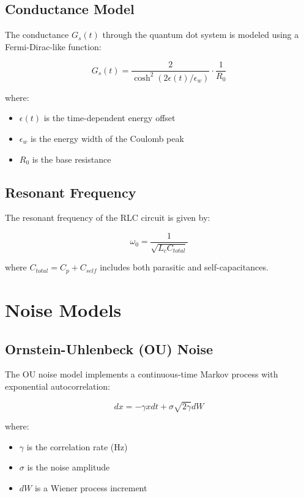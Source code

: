 \documentclass[11pt,a4paper]{article}
\begin{document}
\subsection{Conductance Model}

The conductance $G_s(t)$ through the quantum dot system is modeled using a Fermi-Dirac-like function:

\begin{equation}
G_s(t) = \frac{2}{\cosh^2(2\epsilon(t)/\epsilon_w)} \cdot \frac{1}{R_0}
\end{equation}

where:
\begin{itemize}
\item $\epsilon(t)$ is the time-dependent energy offset
\item $\epsilon_w$ is the energy width of the Coulomb peak
\item $R_0$ is the base resistance
\end{itemize}

\subsection{Resonant Frequency}

The resonant frequency of the RLC circuit is given by:

\begin{equation}
\omega_0 = \frac{1}{\sqrt{L_c C_{total}}}
\end{equation}

where $C_{total} = C_p + C_{self}$ includes both parasitic and self-capacitances.

\section{Noise Models}

\subsection{Ornstein-Uhlenbeck (OU) Noise}

The OU noise model implements a continuous-time Markov process with exponential autocorrelation:

\begin{equation}
dx = -\gamma x dt + \sigma \sqrt{2\gamma} dW
\end{equation}

where:
\begin{itemize}
\item $\gamma$ is the correlation rate (Hz)
\item $\sigma$ is the noise amplitude
\item $dW$ is a Wiener process increment
\end{itemize}
\end{document}
